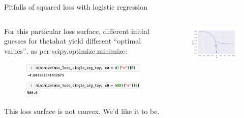 \documentclass[aspectratio=169]{../latex_main/tntbeamer}  %
\begin{document}
	
	\begin{frame}{Pitfalls of squared loss with logistic regression}
	    \begin{columns}
	        \begin{column}{.5\textwidth}
	                For this particular loss surface, different initial guesses for thetahat yield different “optimal values”, as per scipy.optimize.minimize:
	                \begin{figure}
	                    \centering
	                    \includegraphics[scale=.65]{Bild15}
	                \end{figure}
	                This loss surface is not convex. We’d like it to be.
	        \end{column}
	        
	        \begin{column}{.5\textwidth}
	                \begin{figure}
	                    \centering
	                    \includegraphics[scale=.65]{Bild16}
	                \end{figure}
	        \end{column}
	    \end{columns}
	\end{frame}
	
\end{document}
